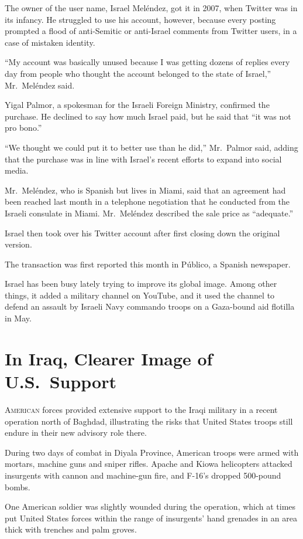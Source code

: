 ﻿\documentclass[12pt]{article}
\begin{document}
The owner of the user name, Israel Mel\'endez, got it in 2007, when Twitter was in its infancy. He
struggled to use his account, however, because every posting prompted a flood of anti-Semitic or
anti-Israel comments from Twitter users, in a case of mistaken identity.

``My account was basically unused because I was getting dozens of replies every day from people who
thought the account belonged to the state of Israel,'' Mr.~Mel\'endez said.

Yigal Palmor, a spokesman for the Israeli Foreign Ministry, confirmed the purchase. He declined to
say how much Israel paid, but he said that ``it was not pro bono.''

``We thought we could put it to better use than he did,'' Mr.~Palmor said, adding that the purchase
was in line with Israel's recent efforts to expand into social media.

Mr.~Mel\'endez, who is Spanish but lives in Miami, said that an agreement had been reached last
month in a telephone negotiation that he conducted from the Israeli consulate in Miami.
Mr.~Mel\'endez described the sale price as ``adequate.''

Israel then took over his Twitter account after first closing down the original version.

The transaction was first reported this month in Público, a Spanish newspaper.

Israel has been busy lately trying to improve its global image. Among other things, it added a
military channel on YouTube, and it used the channel to defend an assault by Israeli Navy commando
troops on a Gaza-bound aid flotilla in May.

\pagebreak
\section{In Iraq, Clearer Image of U.S.~Support}

\lettrine{A}{merican} forces provided extensive support to the Iraqi
military in a recent operation north of Baghdad, illustrating the risks that United States troops
still endure in their new advisory role there.

During two days of combat in Diyala Province, American troops were armed with mortars, machine guns
and sniper rifles. Apache and Kiowa helicopters attacked insurgents with cannon and machine-gun
fire, and F-16's dropped 500-pound bombs.

One American soldier was slightly wounded during the operation, which at times put United States
forces within the range of insurgents' hand grenades in an area thick with trenches and palm groves.
\end{document}
